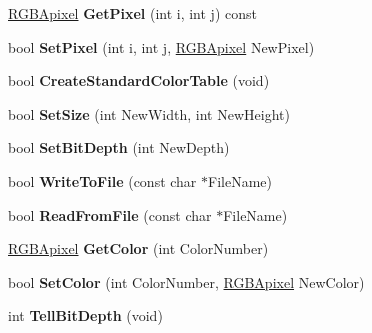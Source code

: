 \begin{DoxyCompactItemize}
\item 
\hypertarget{class_b_m_p_aeb43ee5e67bfd5866eb0a24ae9cca218}{\hyperlink{struct_r_g_b_apixel}{R\-G\-B\-Apixel} {\bfseries Get\-Pixel} (int i, int j) const }\label{class_b_m_p_aeb43ee5e67bfd5866eb0a24ae9cca218}

\item 
\hypertarget{class_b_m_p_ae378a2baa9e7690b94a0b37d29719818}{bool {\bfseries Set\-Pixel} (int i, int j, \hyperlink{struct_r_g_b_apixel}{R\-G\-B\-Apixel} New\-Pixel)}\label{class_b_m_p_ae378a2baa9e7690b94a0b37d29719818}

\item 
\hypertarget{class_b_m_p_a10f253e8dabe8ee5f4c1825579a985d3}{bool {\bfseries Create\-Standard\-Color\-Table} (void)}\label{class_b_m_p_a10f253e8dabe8ee5f4c1825579a985d3}

\item 
\hypertarget{class_b_m_p_a2508215650ae9b72ab85d7b7e336378e}{bool {\bfseries Set\-Size} (int New\-Width, int New\-Height)}\label{class_b_m_p_a2508215650ae9b72ab85d7b7e336378e}

\item 
\hypertarget{class_b_m_p_a8274e16938a5ae0a71210f140e2fc016}{bool {\bfseries Set\-Bit\-Depth} (int New\-Depth)}\label{class_b_m_p_a8274e16938a5ae0a71210f140e2fc016}

\item 
\hypertarget{class_b_m_p_abb9f9f6a073c1eb9dfcc3799a25d15ab}{bool {\bfseries Write\-To\-File} (const char $\ast$File\-Name)}\label{class_b_m_p_abb9f9f6a073c1eb9dfcc3799a25d15ab}

\item 
\hypertarget{class_b_m_p_ae396a195224d9ab9f4659d4d84683cc2}{bool {\bfseries Read\-From\-File} (const char $\ast$File\-Name)}\label{class_b_m_p_ae396a195224d9ab9f4659d4d84683cc2}

\item 
\hypertarget{class_b_m_p_a3bad05db381bfcb97abb8d385f43097f}{\hyperlink{struct_r_g_b_apixel}{R\-G\-B\-Apixel} {\bfseries Get\-Color} (int Color\-Number)}\label{class_b_m_p_a3bad05db381bfcb97abb8d385f43097f}

\item 
\hypertarget{class_b_m_p_aa1b4400834341da1e6551f52a32b3956}{bool {\bfseries Set\-Color} (int Color\-Number, \hyperlink{struct_r_g_b_apixel}{R\-G\-B\-Apixel} New\-Color)}\label{class_b_m_p_aa1b4400834341da1e6551f52a32b3956}

\item 
\hypertarget{class_b_m_p_a4ce7ba10524707a536bfd3f69e4a7934}{int {\bfseries Tell\-Bit\-Depth} (void)}\label{class_b_m_p_a4ce7ba10524707a536bfd3f69e4a7934}


\end{DoxyCompactItemize}
